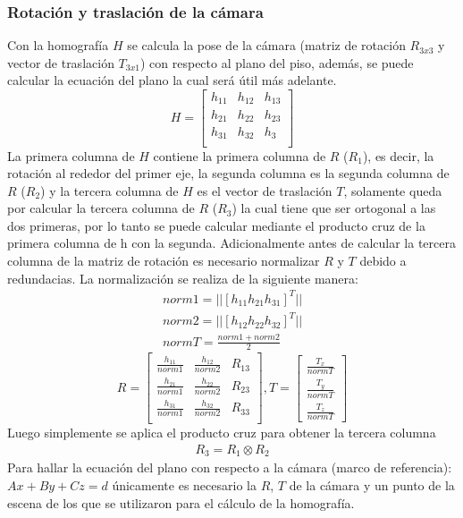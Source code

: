        \subsubsection{Rotación y traslación de la cámara}
       Con la homografía $H$ se calcula la pose de la cámara (matriz de rotación $R_{3x3}$ y vector de traslación $T_{3x1}$) con respecto al plano del piso, además, se puede calcular la ecuación del plano la cual será útil más adelante.\\
       \[H=
       \begin{bmatrix}
       h_{11} & h_{12} & h_{13}\\
       h_{21} & h_{22} & h_{23}\\
       h_{31} & h_{32} & h_{3}\\
       \end{bmatrix}
       \]          
       	La primera columna de $H$ contiene la primera columna de $R$ ($R_1$), es decir, la rotación al rededor del primer eje, la segunda columna es la segunda columna de $R$ ($R_2$) y la tercera columna de $H$ es el vector de traslación $T$, solamente queda por calcular la tercera columna de $R$ ($R_3$) la cual tiene que ser ortogonal a las dos primeras, por lo tanto se puede calcular mediante el producto cruz de la primera columna de h con la segunda. Adicionalmente antes de calcular la tercera columna de la matriz de rotación es necesario normalizar $R$ y $T$ debido a redundacias. La normalización se realiza de la siguiente manera:
       	\begin{eqnarray}
       	norm1=||[h_{11} h_{21} h_{31}]^T||\\
       	norm2=||[h_{12} h_{22} h_{32}]^T||\\
       	normT=\frac{norm1+norm2}{2}			
       	\end{eqnarray}
       	\[R=
       	\begin{bmatrix}
       	\frac{h_{11}}{norm1} & \frac{h_{12}}{norm2} & R_{13}\\
       	\frac{h_{21}}{norm1} & \frac{h_{22}}{norm2} & R_{23}\\
       	\frac{h_{31}}{norm1} & \frac{h_{32}}{norm2} & R_{33}\\
       	\end{bmatrix}
       	, T=
       	\begin{bmatrix}
       	\frac{T_x}{normT}\\
       	\frac{T_y}{normT}\\
       	\frac{T_z}{normT}	
       	\end{bmatrix}
       	\]
       	Luego simplemente se aplica el producto cruz para obtener la tercera columna
       	\begin{eqnarray}
       	R_3=R_1 \otimes R_2
       	\end{eqnarray}
       	Para hallar la ecuación del plano con respecto a la cámara (marco de referencia): $Ax+By+Cz=d$ únicamente es necesario la $R$, $T$ de la cámara y un punto de la escena de los que se utilizaron para el cálculo de la homografía.

